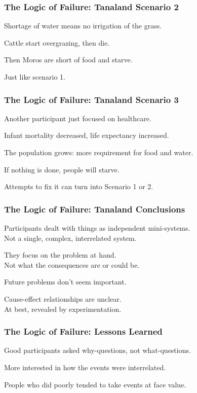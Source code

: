 \begin{frame}
\frametitle{The Logic of Failure: Tanaland Scenario 2}
\begin{changemargin}{1cm}
Shortage of water means no irrigation of the grass.

Cattle start overgrazing, then die.

Then Moros are short of food and starve.

Just like scenario 1.

\end{changemargin}
\end{frame}

\begin{frame}
\frametitle{The Logic of Failure: Tanaland Scenario 3}
\begin{changemargin}{1cm}
Another participant just focused on healthcare.

Infant mortality decreased, life expectancy increased.

The population grows: more requirement for food and water.

If nothing is done, people will starve.

Attempts to fix it can turn into Scenario 1 or 2.

\end{changemargin}
\end{frame}

\begin{frame}
\frametitle{The Logic of Failure: Tanaland Conclusions}
\begin{changemargin}{1cm}
Participants dealt with things as independent mini-systems.\\
\quad Not a single, complex, interrelated system. 

They focus on the problem at hand. \\
\quad Not what the consequences are or could be. 

Future problems don't seem important.

Cause-effect relationships are unclear.\\
\quad At best, revealed by experimentation.

\end{changemargin}
\end{frame}


\begin{frame}
\frametitle{The Logic of Failure: Lessons Learned}
\begin{changemargin}{1cm}
Good participants asked why-questions, not what-questions.

More interested in how the events were interrelated.

People who did poorly tended to take events at face value.

\end{changemargin}
\end{frame}


